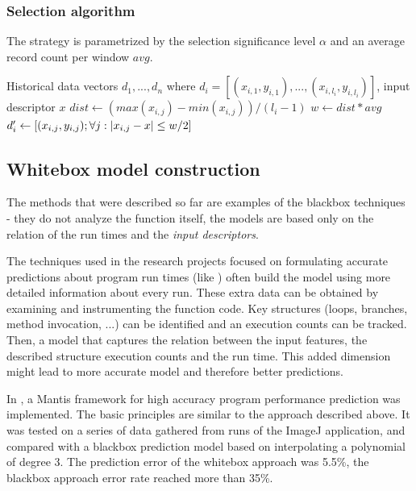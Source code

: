 \subsubsection{Selection algorithm}

The strategy is parametrized by the selection significance level $\alpha$ and an average record count per window $avg$.

\begin{algorithmic}[1] %
	\INPUT Historical data vectors $d_1,...,d_n$ where $d_i = [(x_{i,1}, y_{i,1}),...,(x_{i,l_i}, y_{i,l_i})]$, input descriptor $x$
	\State $dist \gets (max(x_{i,j}) - min(x_{i,j})) / (l_i-1)$
	\State $w \gets dist * avg$
	\State $d'_i \gets [(x_{i,j}, y_{i, j}); \forall j: \left|{x_{i,j} - x}\right| \leq w/2]$
	\EndFor
	\State {}
\end{algorithmic}

\subsection{Whitebox model construction}

The methods that were described so far are examples of the blackbox techniques - they do not analyze the function itself, the models are based only on the relation of the run times and the \textit{input descriptors}. 

The techniques used in the research projects focused on formulating accurate predictions about program run times (like \cite{goldsmith_measuring_2007,chun_mantis:_2010,huang_predicting_2010}) often build the model using more detailed information about every run. These extra data can be obtained by examining and instrumenting the function code. Key structures (loops, branches, method invocation, ...) can be identified and an execution counts can be tracked. Then, a model that captures the relation between the input features, the described structure execution counts and the run time. This added dimension might lead to more accurate model and therefore better predictions.

In \cite{chun_mantis:_2010}, a Mantis framework for high accuracy program performance prediction was implemented. The basic principles are similar to the approach described above. It was tested on a series of data gathered from runs of the ImageJ application, and compared with a blackbox prediction model based on interpolating a polynomial of degree 3. The prediction error of the whitebox approach was 5.5\%, the blackbox approach error rate reached more than 35\%.

